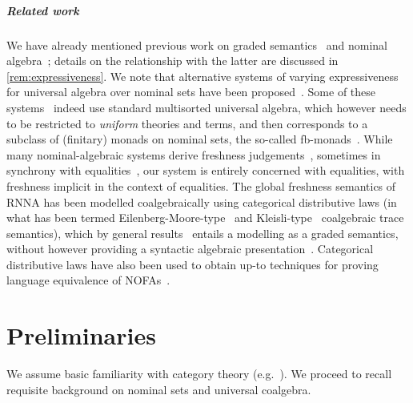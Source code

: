 \documentclass[11pt,a4paper]{amsart}
\theoremstyle{plain}
\numberwithin{equation}{section}
\newcommand{\+}[1]{\mathcal{#1}\xspace}
\theoremstyle{definition}
\begin{document}
\subparagraph*{Related work} We have already mentioned previous work
on graded
semantics~\cite{MiliusEA15,DorschEA19,FordEA21,FordEA22,ForsterEA25a,ForsterEA25b}
and nominal algebra~\cite{GabbayMathijssen09}; details on the
relationship with the latter are discussed in
\cref{rem:expressiveness}. We note that alternative systems of varying
expressiveness for universal algebra over nominal sets have been
proposed~\cite{CloustonPitts07,KurzPetrisan10}. Some of these
systems~\cite{KurzPetrisan10,KurzEA10} indeed use standard multisorted
universal algebra, which however needs to be restricted to
\emph{uniform} theories and terms, and then corresponds to a subclass
of (finitary) monads on nominal sets, the so-called
fb-monads~\cite{KurzEA10}. While many nominal-algebraic systems derive
freshness
judgements~\cite{Gabbay09,GabbayMathijssen09,CloustonPitts07},
sometimes in synchrony with equalities~\cite{CloustonPitts07}, our
system is entirely concerned with equalities, with freshness implicit
in the context of equalities. The global freshness semantics of RNNA
has been modelled coalgebraically using categorical distributive laws
(in what has been termed Eilenberg-Moore-type~\cite{AdamekEA12} and
Kleisli-type~\cite{HasuoEA07} coalgebraic trace semantics), which by
general results~\cite{MiliusEA15} entails a modelling as a graded
semantics, without however providing a syntactic algebraic
presentation~\cite{FrankEA22}. Categorical distributive laws have also
been used to obtain up-to techniques for proving language equivalence
of NOFAs~\cite{BonchiEA14}. %

\section{Preliminaries}
\label{sec:prelims}
We assume basic familiarity with category theory
(e.g.~\cite{AdamekEA90}). We proceed to recall requisite background on
nominal sets and universal coalgebra.
\end{document}
